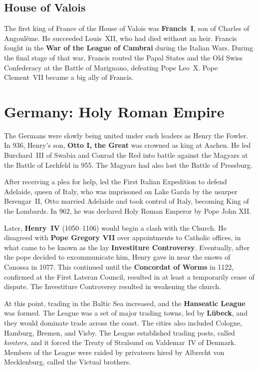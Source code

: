\subsection*{House of Valois}

The first king of France of the House of Valois was \textbf{Francis~I}, son of Charles of Angoul\^eme.
He succeeded Louis~XII, who had died without an heir.
Francis fought in the \textbf{War of the League of Cambrai} during the Italian Wars.
During the final stage of that war, Francis routed the Papal States and the Old Swiss Confederacy
at the Battle of Marignano, defeating Pope Leo~X.
Pope Clement~VII became a big ally of Francis.

\section{Germany: Holy Roman Empire}

The Germans were slowly being united under such leaders as Henry the Fowler.
In 936, Henry's son, \textbf{Otto I, the Great} was crowned as king at Aachen.
He led Burchard~III of Swabia and Conrad the Red into battle
against the Magyars at the Battle of Lechfeld in 955.
The Magyars had also lost the Battle of Pressburg.

After receiving a plea for help, led the First Italian Expedition to defend Adelaide, queen of Italy,
who was imprisoned on Lake Garda by the usurper Berengar~II,
Otto married Adelaide and took control of Italy, becoming King of the Lombards.
In 962, he was declared Holy Roman Emperor by Pope John XII\@.

Later, \textbf{Henry~IV} (1050--1106) would begin a clash with the Church.
He disagreed with \textbf{Pope Gregory VII} over appointments to Catholic offices,
in what came to be known as the lay \textbf{Investiture Controversy}.
Eventually, after the pope decided to excommunicate him, Henry gave in near the snows of Canossa in 1077.
This continued until the \textbf{Concordat of Worms} in 1122,
confirmed at the First Lateran Council,
resulted in at least a temporarily cease of dispute.
The Investiture Controversy resulted in weakening the church.

At this point, trading in the Baltic Sea increased, and the \textbf{Hanseatic League} was formed.
The League was a set of major trading towns, led by \textbf{L\"ubeck}, and they would dominate trade across the coast.
The cities also included Cologne, Hamburg, Bremen, and Visby.
The League established trading posts, called \textit{kontors},
and it forced the Treaty of Stralsund on Valdemar~IV of Denmark.
Members of the League were raided by privateers hired by Albrecht von Mecklenburg, called the Victual brothers.

